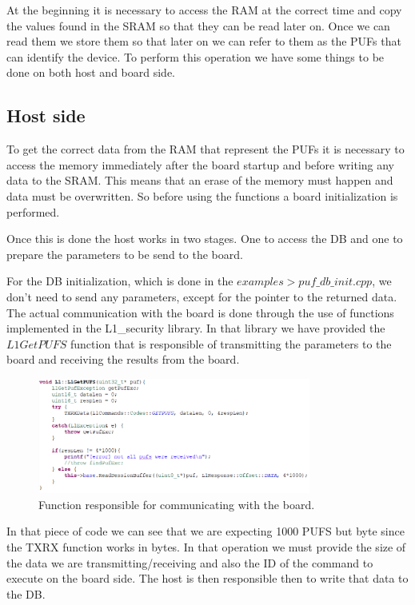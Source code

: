 At the beginning it is necessary to access the RAM at the correct time and copy the values found in the SRAM so that they can be read later on. Once we can read them we store them so that later on we can refer to them as the PUFs that can identify the device. To perform this operation we have some things to be done on both host and board side.

\subsection{Host side}

To get the correct data from the RAM that represent the PUFs it is necessary to access the memory immediately after the board startup and before writing any data to the SRAM. This means that an erase of the memory must happen and data must be overwritten. So before using the functions a board initialization is performed.

Once this is done the host works in two stages. One to access the DB and one to prepare the parameters to be send to the board.

For the DB initialization, which is done in the $examples > puf\_db\_init.cpp$, we don't need to send any parameters, except for the pointer to the returned data.
The actual communication with the board is done through the use of functions implemented in the L1\_security library. In that library we have provided the $L1GetPUFS$ function that is responsible of transmitting the parameters to the board and receiving the results from the board.

\begin{figure}[h!]
	\vspace{0.5cm}
	\includegraphics[width = 0.8\textwidth]{images/L1GetPUFS.png}
	\caption{Function responsible for communicating with the board. }
	\label{fig:L1GetPUFS}
\end{figure}

In that piece of code we can see that we are expecting 1000 PUFS but byte since the TXRX function works in bytes. In that operation we must provide the size of the data we are transmitting/receiving and also the ID of the command to execute on the board side.
The host is then responsible then to write that data to the DB.

